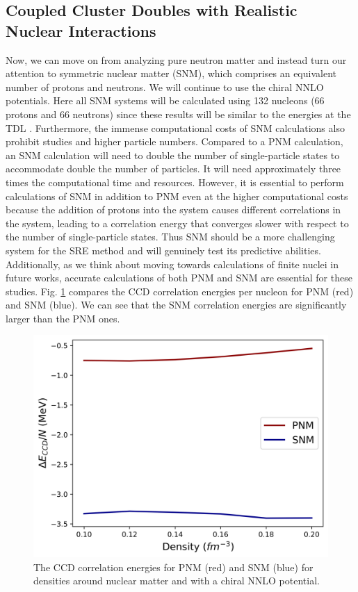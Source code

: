 \subsection{Coupled Cluster Doubles with Realistic Nuclear Interactions}

Now, we can move on from analyzing pure neutron matter and instead turn our attention to symmetric nuclear matter (SNM), which comprises an equivalent number of protons and neutrons. We will continue to use the chiral NNLO potentials. Here all SNM systems will be calculated using 132 nucleons (66 protons and 66 neutrons) since these results will be similar to the energies at the TDL \cite{Ref9}.   Furthermore, the immense computational costs of SNM calculations also prohibit studies and higher particle numbers. Compared to a PNM calculation, an SNM calculation will need to double the number of single-particle states to accommodate double the number of particles. It will need approximately three times the computational time and resources. However, it is essential to perform calculations of SNM in addition to PNM even at the higher computational costs because the addition of protons into the system causes different correlations in the system, leading to a correlation energy that converges slower with respect to the number of single-particle states. Thus SNM should be a more challenging system for the SRE method and will genuinely test its predictive abilities.
Additionally, as we think about moving towards calculations of finite nuclei in future works, accurate calculations of both PNM and SNM are essential for these studies. Fig. \ref{fig:pnm_and_snm} compares the CCD correlation energies per nucleon for PNM (red) and SNM (blue). We can see that the SNM correlation energies are significantly larger than the PNM ones.



\begin{figure}
    \centering
    \includegraphics[scale=0.75]{Images/Chapter8/pnm_and_snm.png}
    \caption{The CCD correlation energies for PNM (red) and SNM (blue) for densities around nuclear matter and with a chiral NNLO potential.}
    \label{fig:pnm_and_snm}
\end{figure}

